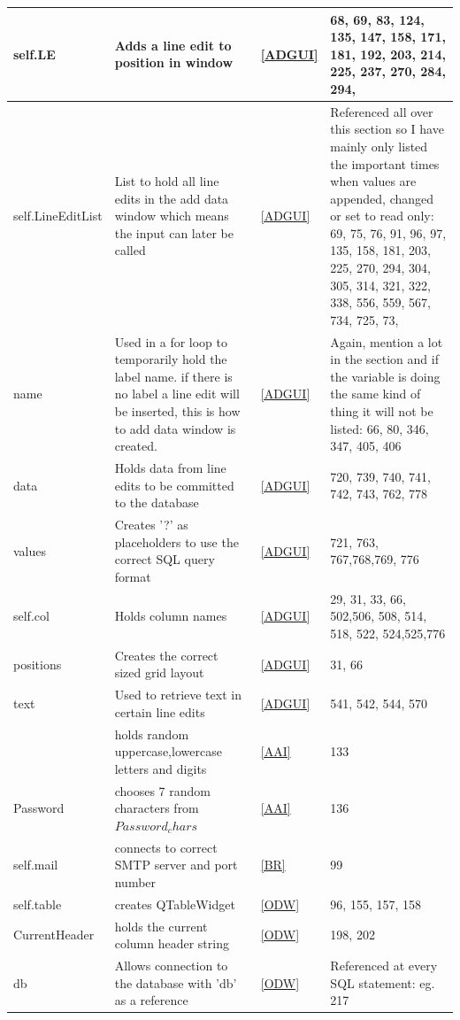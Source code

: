 \begin{center}
\begin{longtable}{|p{4cm}|p{3cm}|p{2cm}|p{3cm}|}
self.LE & Adds a line edit to position in window & \ref{ADGUI} &68, 69, 83, 124, 135, 147, 158, 171, 181, 192, 203, 214, 225, 237, 270, 284, 294,     \\ \hline
self.LineEditList & List to hold all line edits in the add data window which means the input can later be called & \ref{ADGUI} & Referenced all over this section so I have mainly only listed the important times when values are appended, changed or set to read only: 69, 75, 76, 91, 96, 97, 135, 158, 181, 203, 225, 270, 294, 304, 305, 314, 321, 322, 338, 556, 559, 567, 734, 725, 73,       \\ \hline
name & Used in a for loop to temporarily hold the label name. if there is no label a line edit will be inserted, this is how to add data window is created. & \ref{ADGUI} &  Again, mention a lot in the section and if the variable is doing the same kind of thing it will not be listed: 66, 80, 346, 347, 405, 406\\ \hline
data & Holds data from line edits to be committed to the database  & \ref{ADGUI} & 720, 739, 740, 741, 742, 743, 762, 778   \\ \hline
values & Creates '?' as placeholders to use the correct SQL query format  & \ref{ADGUI} & 721, 763, 767,768,769, 776  \\ \hline
self.col & Holds column names & \ref{ADGUI} &29, 31, 33, 66, 502,506, 508, 514, 518, 522, 524,525,776    \\ \hline
positions & Creates the correct sized grid layout & \ref{ADGUI} &31, 66   \\ \hline
text & Used to retrieve text in certain line edits  & \ref{ADGUI} & 541, 542, 544, 570 \\ \hline

\verb Password_chars & holds random uppercase,lowercase letters and digits & \ref{AAI} & 133 \\ \hline
Password & chooses 7 random characters from  $Password_chars$& \ref{AAI} & 136 \\ \hline

self.mail & connects to correct SMTP server and port number& \ref{BR} & 99  \\ \hline


self.table & creates QTableWidget& \ref{ODW} & 96, 155, 157, 158 \\ \hline
CurrentHeader & holds the current column header string& \ref{ODW} & 198, 202 \\ \hline
db & Allows connection to the database with 'db' as a reference& \ref{ODW}& Referenced at every SQL statement: eg. 217\\ \hline


\end{longtable}
\end{center}
